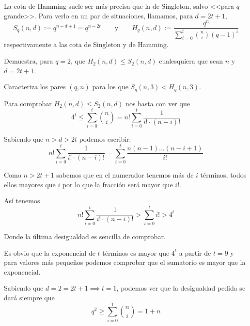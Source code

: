 \begin{problem}[10] La cota de Hamming suele ser más precisa que la de Singleton, salvo <<para $q$ grande>>. Para verlo en un par de situaciones, llamamos, para $d=2t+1$, $$S_q(n,d):=q^{n-d+1}=q^{n-2t}\qquad \text{y} \qquad H_q(n,d):=\frac{q^n}{\sum_{i=0}^t \binom{n}{i}(q-1)^i}$$ respectivamente a las cota de Singleton y de Hamming.

\ppart Demuestra, para $q=2$, que $H_2(n,d)\le S_2(n,d)$ cualesquiera que sean $n$ y $d=2t+1$.

\ppart Caracteriza los pares $(q,n)$ para los que $S_q(n,3)<H_q(n,3)$.

\solution


\spart

Para comprobar $H_2(n,d) \leq S_2(n,d)$ nos basta con ver que
\[4^{t} \leq \sum_{i=0}^t \binom{n}{i} = n! \sum_{i=0}^t\frac{1}{i!\cdot (n-i)!}\]

Sabiendo que $n>d > 2t$ podemos escribir:
\[ n! \sum_{i=0}^t\frac{1}{i!\cdot (n-i)!} =\sum_{i=0}^t\frac{n(n-1)...(n-i+1)}{i!}\]

Como $n>2t+1$ sabemos que en el numerador tenemos más de $i$ términos, todos ellos mayores que $i$ por lo que la fracción será mayor que $i!$.

Así tenemos
\[n! \sum_{i=0}^t\frac{1}{i!\cdot (n-i)!} > \sum_{i=0}^t i! > 4^t\]

Donde la última desigualdad es sencilla de comprobar.

Es obvio que la exponencial de $t$ términos es mayor que $4^t$ a partir de $t=9$ y para valores más pequeños podemos comprobar que el sumatorio es mayor que la exponencial.

\spart

Sabiendo que $d=2=2t+1 \implies t=1$, podemos ver que la desigualdad pedida se dará siempre que
\[q^{2} \geq \sum_{i=0}^1 \binom{n}{i} = 1 + n\]

\end{problem}

